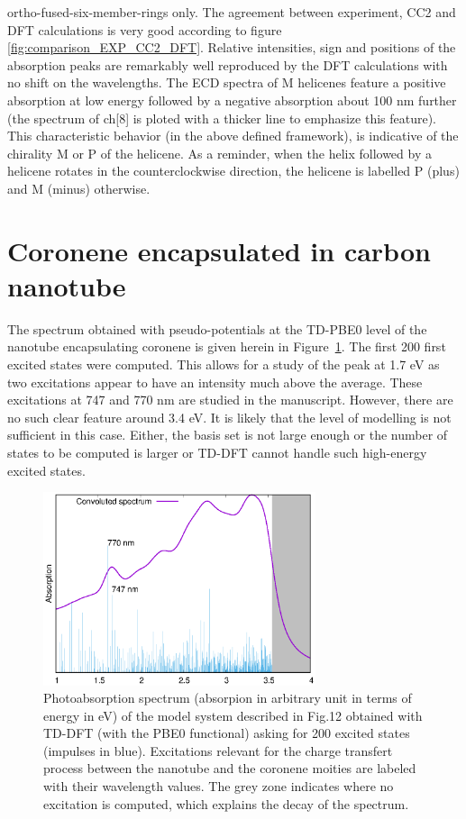 \documentclass[aip]{revtex4-1}
\begin{document}
ortho-fused-six-member-rings only.
The agreement between experiment, CC2 and DFT calculations is very good according to
figure \ref{fig:comparison_EXP_CC2_DFT}.
Relative intensities, sign and positions of the absorption peaks are remarkably
well reproduced by the DFT calculations with no shift on the wavelengths.
The ECD spectra of M helicenes feature a positive absorption at low energy 
followed by a negative absorption about 100 nm further (the spectrum of ch[8]
is ploted with a thicker line to emphasize this feature).
This characteristic behavior (in the above defined framework), is indicative
of the chirality M or P of the helicene.
As a reminder, when the helix followed by a helicene rotates in the counterclockwise
direction, the helicene is labelled P (plus) and M (minus) otherwise.

\clearpage

\section*{Coronene encapsulated in carbon nanotube}

The spectrum obtained with pseudo-potentials at the TD-PBE0 level of the nanotube encapsulating coronene is given herein in Figure~\ref{fig:spectrum_nanotube}.
The first 200 first excited states were computed.
This allows for a study of the peak at 1.7 eV as two excitations appear to have an intensity much above the average.
These excitations at 747 and 770 nm are studied in the manuscript.
However, there are no such clear feature around 3.4 eV.
It is likely that the level of modelling is not sufficient in this case.
Either, the basis set is not large enough or the number of states to be computed is larger
or TD-DFT cannot handle such high-energy excited states.

\begin{figure}
\begin{center}
\includegraphics[width=8cm]{spectrum_w_impulses.eps}
\end{center}
\caption{\label{fig:spectrum_nanotube} 
Photoabsorption spectrum
(absorpion in arbitrary unit in terms of energy in eV)
of the model system described in Fig.12
obtained with TD-DFT (with the PBE0 functional) asking for 200
excited states (impulses in blue).
Excitations relevant for the charge transfert process between
the nanotube and the coronene moities are labeled with their wavelength values.
The grey zone indicates where no excitation is computed, which explains the
decay of the spectrum.
}
\end{figure}
\end{document}
